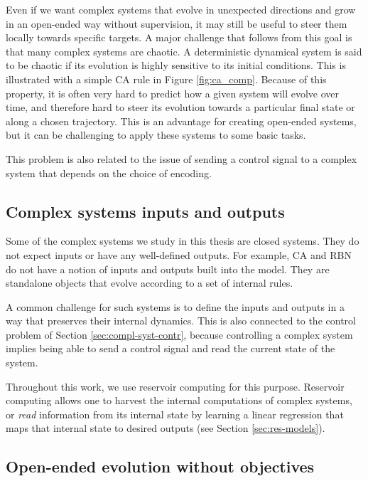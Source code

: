 Even if we want complex systems that evolve in unexpected directions and grow in
an open-ended way without supervision, it may still be useful to steer them
locally towards specific targets. A major challenge that follows from this goal
is that many complex systems are chaotic. A deterministic dynamical system is
said to be chaotic if its evolution is highly sensitive to its initial
conditions. This is illustrated with a simple \ac{CA} rule in Figure \ref{fig:ca_comp}. 
Because of this property, it is often very hard to predict how a
given system will evolve over time, and therefore hard to steer its evolution
towards a particular final state or along a chosen trajectory. This is an
advantage for creating open-ended systems, but it can be challenging to apply
these systems to some basic tasks.

This problem is also related to the issue of sending a control signal to a
complex system that depends on the choice of encoding.

\subsection{Complex systems inputs and outputs\label{sec:compl-syst-inputs}}

Some of the complex systems we study in this thesis are closed systems. They do
not expect inputs or have any well-defined outputs. For example, \ac{CA} and
\ac{RBN} do not have a notion of inputs and outputs built into the model. They
are standalone objects that evolve according to a set of internal rules.

A common challenge for such systems is to define the inputs and outputs in a way
that preserves their internal dynamics. This is also connected to the control
problem of Section \ref{sec:compl-syst-contr}, because controlling a complex
system implies being able to send a control signal and read the current
state of the system.

Throughout this work, we use reservoir computing for this purpose. Reservoir
computing allows one to harvest the internal computations of complex systems, or
\emph{read} information from its internal state by learning a linear regression
that maps that internal state to desired outputs (see Section
\ref{sec:res-models}).



\subsection{Open-ended evolution without
  objectives}\label{sec:open-ended-evolution}


